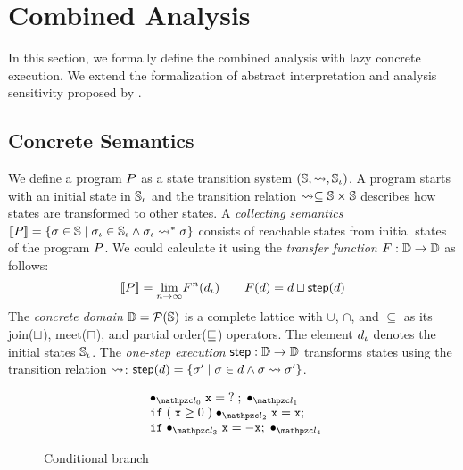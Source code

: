 \section{Combined Analysis}\label{sec:formal}

In this section, we formally define the combined analysis with lazy concrete
execution.  We extend the formalization of abstract interpretation and analysis
sensitivity proposed by \citet{sens-toplas}.


\subsection{Concrete Semantics}

We define a program $P$ as a state transition system $(\mathbb{S}, \leadsto,
\mathbb{S}_\iota)$.  A program starts with an initial state in $\mathbb{S}_\iota$ and the
transition relation $\leadsto \subseteq \mathbb{S} \times \mathbb{S}$ describes how states
are transformed to other states.  A \textit{collecting semantics} $[\![{P}]\!] =
\{ \sigma \in \mathbb{S} \mid \sigma_\iota \in \mathbb{S}_\iota \wedge \sigma_\iota \leadsto^* \sigma \}$ consists of
reachable states from initial states of the program $P$.  We could calculate
it using the \textit{transfer function} $F: \mathbb{D} \rightarrow \mathbb{D}$ as
follows:
\[
  [\![{P}]\!] = \underset{n \rightarrow \infty}{\lim}{F^n(d_\iota)}\\
  \qquad
  F(d) = d \sqcup \textsf{step}(d)\\
\]
The \textit{concrete domain} $\mathbb{D} = \mathcal{P}(\mathbb{S})$ is a complete lattice
with $\cup$, $\cap$, and $\subseteq$ as its join($\sqcup$), meet($\sqcap$), and
partial order($\sqsubseteq$) operators.  The element $d_\iota$ denotes the initial
states $\mathbb{S}_\iota$.  The \textit{one-step execution} $\textsf{step}: \mathbb{D} \rightarrow
\mathbb{D}$ transforms states using the transition relation $\leadsto$: $\textsf{step}(d) =
\{ \sigma' \mid \sigma \in d \wedge \sigma \leadsto \sigma' \}$.

\begin{figure}[H]
  \[
    \begin{array}{l}
      \enspace \labdot{0} \; \varx = \;? \; ;  \; \labdot{1}\\
      \enspace \kwif \; (\; \varx \geq 0 \;) \; \labdot{2} \; \varx = \varx ;\\
      \enspace \kwelse \; \labdot{3} \; \varx = -\varx ;  \; \labdot{4}\\
    \end{array}
  \]
\vspace*{-1em}
\caption{Conditional branch}
\label{fig:running-example}
\end{figure}

